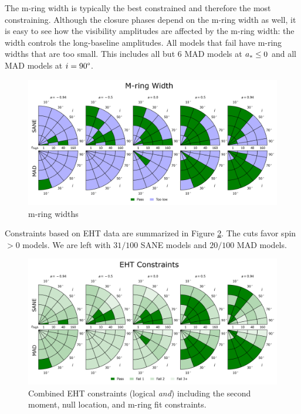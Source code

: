 The m-ring width is typically the best constrained and therefore the most constraining.  Although the closure phases depend on the m-ring width as well, it is easy to see how the visibility amplitudes are affected by the m-ring width: the width controls the long-baseline amplitudes.  All models that fail have m-ring widths that are too small.  This includes all but 6 MAD models at $a_* \le 0$ and all MAD models at $i = 90\degree$.

\begin{figure}
  \centering
  \includegraphics[width=\columnwidth]{./figures/Mring_w_Constraints.png}
  \caption{m-ring widths}
  \label{fig:cmp_m-ring_width}
\end{figure}


Constraints based on EHT data are summarized in Figure \ref{fig:all_EHT_constraints}.  The cuts favor spin $> 0$ models.
We are left with $31/100$ SANE models and $20/100$ MAD models.

\begin{figure}
  \centering
    \includegraphics[width=\columnwidth]{./figures/Interferometric_Constraints.png}
  \caption{Combined EHT constraints (logical {\em and}) including the second moment, null location, and m-ring fit constraints.}
  \label{fig:all_EHT_constraints}
\end{figure}


